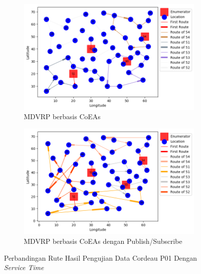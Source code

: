 \begin{figure}[!]
    \centering
    \begin{subfigure}[t]{\textwidth}
        \centering
		\includegraphics[width=\textwidth]{Resources/Images/test_result_normal_cordeau_p01_coes}
		\caption{MDVRP berbasis CoEAs}
		\label{fig:test_result_normal_cordeau_coes}
    \end{subfigure}%
    
    \begin{subfigure}[t]{\textwidth}
        \centering
		\includegraphics[width=\textwidth]{Resources/Images/test_result_normal_cordeau_p01_pubsub_coes}
		\caption{MDVRP berbasis CoEAs dengan Publish/Subscribe}
		\label{fig:test_result_normal_cordeau_pubsub_coes}
    \end{subfigure}
    \caption{Perbandingan Rute Hasil Pengujian Data Cordeau P01 Dengan \textit{Service Time}}
    \label{fig:test_result_normal_cordeau_comparison}
\end{figure}


